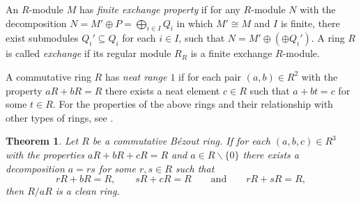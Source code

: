 \documentclass[10pt,a4paper]{amsart}
\theoremstyle{plain}
\newtheorem{theorem}{Theorem}
\theoremstyle{definition}
\begin{document}
An $R$-module $M$  has {\it finite exchange property} if for any $R$-module $N$ with the  decomposition
$N=M'\oplus P=\bigoplus_{i\in I}Q_i$ in which  $M'\cong M$ and $I$ is finite, there exist submodules $Q_i'\subseteq Q_i$ for each $i\in I$, such that $N=M'\oplus(\oplus Q_i')$. A ring $R$ is called {\it exchange} if its regular module $R_R$  is a  finite exchange $R$-module.






A commutative ring $R$ has {\it  neat range $1$} if for each pair  $(a,b)\in R^2$ with the property   \linebreak
$aR+bR=R$ there exists a neat element $c\in R$ such that $a+bt=c$ for some $t\in R$. For the properties of the above rings and their relationship with other types of rings, see \cite{Vas, Lam_2, Lam_3, 6-mcGovern, 10-zabgat, 9-zabavsky}.

\begin{theorem}\label{T:5}
Let $R$ be a commutative B\'ezout ring. If for each  $(a,b,c)\in R^3$  with the properties   $aR+bR+cR=R$ and $a\in R\backslash\{0\}$ there exists a decomposition $a=rs$  for some $r,s\in R$  such that
\begin{equation}\label{Edvvr:1}
rR+bR=R,\qquad  sR+cR=R\qquad  \text{and}\qquad  rR+sR=R,
\end{equation}
then $R/aR$ is a clean ring.
\end{theorem}
\end{document}
